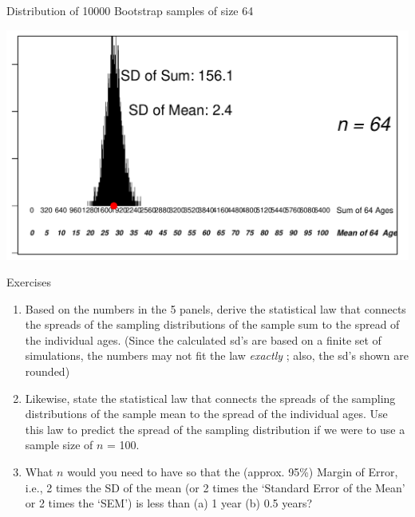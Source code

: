 \documentclass[10pt]{beamer}\usepackage[]{graphicx}\usepackage[]{color}
\makeatletter
\def\maxwidth{ %
  \ifdim\Gin@nat@width>\linewidth
    \linewidth
  \else
    \Gin@nat@width
  \fi
}
\newenvironment{knitrout}{}{} %
\makeatother
\begin{document}
\begin{frame}[fragile]{Distribution of 10000 Bootstrap samples of size 64}
\begin{knitrout}\tiny
{}\color{fgcolor}

{\centering \includegraphics[width=\maxwidth]{figure/unnamed-chunk-6-1} 

}



\end{knitrout}
	
\end{frame}



\begin{frame}{Exercises}

	\begin{enumerate}
		\def\labelenumi{\arabic{enumi}.}
		\item
		Based on the numbers in the 5 panels, derive the statistical law that
		connects the spreads of the sampling distributions of the sample sum
		to the spread of the individual ages. (Since the calculated sd's are
		based on a finite set of simulations, the numbers may not fit the law
		\emph{exactly} ; also, the sd's shown are rounded)
		\item
		Likewise, state the statistical law that connects the spreads of the
		sampling distributions of the sample mean to the spread of the
		individual ages. Use this law to predict the spread of the sampling
		distribution if we were to use a sample size of \(n\) = 100.
		\item
		What \(n\) would you need to have so that the (approx. 95\%) Margin of
		Error, i.e., 2 times the SD of the mean (or 2 times the `Standard
		Error of the Mean' or 2 times the `SEM') is less than (a) 1 year (b)
		0.5 years?
	\end{enumerate}
\end{frame}
\end{document}
